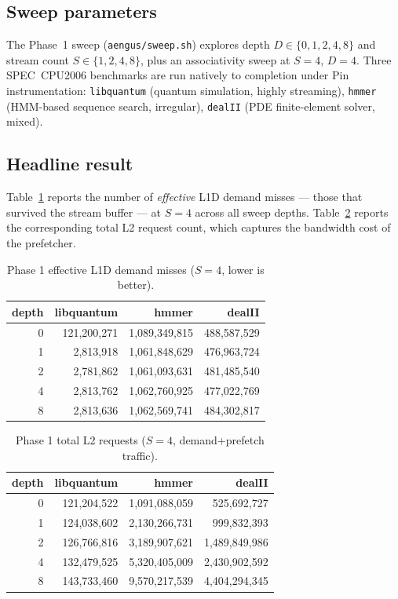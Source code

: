 \documentclass[11pt,letterpaper]{article}
\begin{document}
\subsection{Sweep parameters}
The Phase~1 sweep (\texttt{aengus/sweep.sh}) explores depth
$D \in \{0,1,2,4,8\}$ and stream count $S \in \{1,2,4,8\}$, plus an
associativity sweep at $S=4$, $D=4$. Three SPEC~CPU2006 benchmarks are run
natively to completion under Pin instrumentation:
\texttt{libquantum} (quantum simulation, highly streaming),
\texttt{hmmer} (HMM-based sequence search, irregular),
\texttt{dealII} (PDE finite-element solver, mixed).

\subsection{Headline result}
Table~\ref{tab:phase1-eff} reports the number of \emph{effective} L1D demand
misses --- those that survived the stream buffer --- at $S=4$ across all
sweep depths. Table~\ref{tab:phase1-l2} reports the corresponding total L2
request count, which captures the bandwidth cost of the prefetcher.

\begin{table}[H]
\centering
\caption{Phase 1 effective L1D demand misses ($S=4$, lower is better).}
\label{tab:phase1-eff}
\begin{tabular}{rrrr}
\toprule
depth & libquantum & hmmer & dealII \\
\midrule
0 & 121{,}200{,}271 & 1{,}089{,}349{,}815 & 488{,}587{,}529 \\
1 &   2{,}813{,}918 & 1{,}061{,}848{,}629 & 476{,}963{,}724 \\
2 &   2{,}781{,}862 & 1{,}061{,}093{,}631 & 481{,}485{,}540 \\
4 &   2{,}813{,}762 & 1{,}062{,}760{,}925 & 477{,}022{,}769 \\
8 &   2{,}813{,}636 & 1{,}062{,}569{,}741 & 484{,}302{,}817 \\
\bottomrule
\end{tabular}
\end{table}

\begin{table}[H]
\centering
\caption{Phase 1 total L2 requests ($S=4$, demand+prefetch traffic).}
\label{tab:phase1-l2}
\begin{tabular}{rrrr}
\toprule
depth & libquantum & hmmer & dealII \\
\midrule
0 & 121{,}204{,}522 &   1{,}091{,}088{,}059 &   525{,}692{,}727 \\
1 & 124{,}038{,}602 &   2{,}130{,}266{,}731 &   999{,}832{,}393 \\
2 & 126{,}766{,}816 &   3{,}189{,}907{,}621 & 1{,}489{,}849{,}986 \\
4 & 132{,}479{,}525 &   5{,}320{,}405{,}009 & 2{,}430{,}902{,}592 \\
8 & 143{,}733{,}460 &   9{,}570{,}217{,}539 & 4{,}404{,}294{,}345 \\
\bottomrule
\end{tabular}
\end{table}
\end{document}
